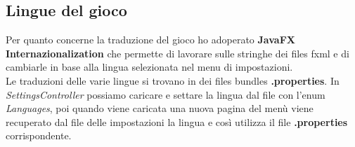 \subsection{Lingue del gioco}

\textsf{\small Per quanto concerne la traduzione del gioco ho adoperato \textbf{JavaFX Internazionalization} che permette di lavorare sulle stringhe dei files fxml e di cambiarle in base alla lingua selezionata nel menu di impostazioni.} \\

\textsf{\small Le traduzioni delle varie lingue si trovano in dei files bundles \textbf{.properties}. In \emph{SettingsController} possiamo caricare e settare la lingua dal file con l'enum \emph{Languages}, poi quando viene caricata una nuova pagina del menù viene recuperato dal file delle impostazioni la lingua e così utilizza il file \textbf{.properties} corrispondente.} \\